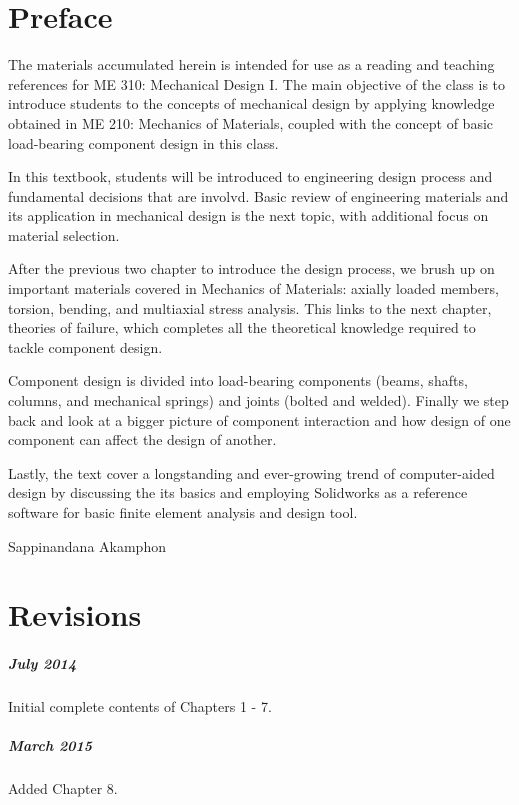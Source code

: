 \documentclass[
10pt,
a4paper,
openany,
svgnames,
]{book}
\begin{document}
\chapter*{Preface}

The materials accumulated herein is intended for use as a reading and teaching references for ME 310: Mechanical Design I. The main objective of the class is to introduce students to the concepts of mechanical design by applying knowledge obtained in ME 210: Mechanics of Materials, coupled with the concept of basic load-bearing component design in this class.

In this textbook, students will be introduced to engineering design process and fundamental decisions that are involvd.  Basic review of engineering materials and its application in mechanical design is the next topic, with additional focus on material selection.

After the previous two chapter to introduce the design process, we brush up on important materials covered in Mechanics of Materials: axially loaded members, torsion, bending, and multiaxial stress analysis. This links to the next chapter, theories of failure, which completes all the theoretical knowledge required to tackle component design.

Component design is divided into load-bearing components (beams, shafts, columns, and mechanical springs) and joints (bolted and welded). Finally we step back and look at a bigger picture of component interaction and how design of one component can affect the design of another.

Lastly, the text cover a longstanding and ever-growing trend of computer-aided design by discussing the its basics and employing Solidworks as a reference software for basic finite element analysis and design tool.

\vspace{2cm}\hspace{10cm} Sappinandana Akamphon


\chapter*{Revisions}

\paragraph{July 2014}
Initial complete contents of Chapters 1 - 7.

\paragraph{March 2015}
Added Chapter 8.
\end{document}
